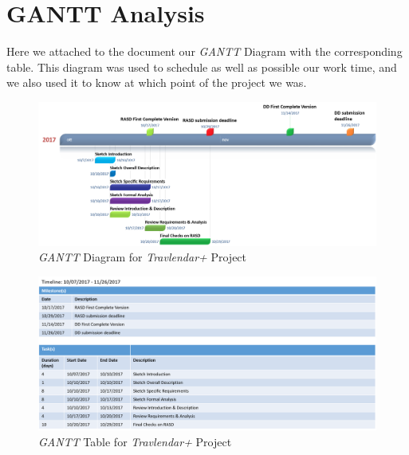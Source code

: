 \section{GANTT Analysis}
Here we attached to the document our \emph{GANTT} Diagram with the corresponding table. This diagram was used to schedule as well as possible our work time, and we also used it to know at which point of the project we was.

\begin{figure}[H]
    \centering
    \includegraphics[scale=0.4]{Pictures/GANTT.png}
    \caption{\emph{GANTT} Diagram for \emph{Travlendar+} Project}
\end{figure}

\begin{figure}[H]
    \centering
    \includegraphics[scale=0.45]{Pictures/GANTTTable.png}
    \caption{\emph{GANTT} Table for \emph{Travlendar+} Project}
\end{figure}